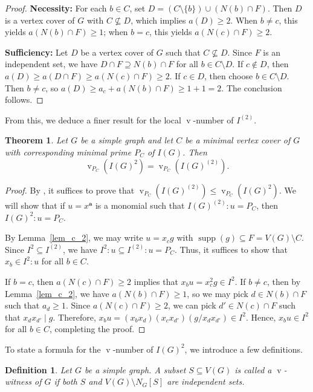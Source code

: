 \documentclass[12pt]{amsart}
\def\v{\operatorname{v}}
\newtheorem{theorem}[lemma]{Theorem}
\newtheorem{definition}[lemma]{Definition}
\begin{document}
\begin{proof}
\textbf{Necessity:} For each $b \in C$, set $D = (C \setminus \{b\}) \cup (N(b) \cap F)$. Then $D$ is a vertex cover of $G$ with $C \not\subseteq D$, which implies $a(D) \ge 2$. When $b \neq c$, this yields $a(N(b) \cap F) \ge 1$; when $b = c$, this yields $a(N(c) \cap F) \ge 2$.

\textbf{Sufficiency:} Let $D$ be a vertex cover of $G$ such that $C \not\subseteq D$. Since $F$ is an independent set, we have $D \cap F \supseteq N(b) \cap F$ for all $b \in C \setminus D$. If $c \notin D$, then $a(D) \ge a(D \cap F) \ge a(N(c) \cap F) \ge 2$. If $c \in D$, then choose $b \in C \setminus D$. Then $b \neq c$, so $a(D) \ge a_c + a(N(b) \cap F) \ge 1 + 1 = 2$. The conclusion follows.
\end{proof}

From this, we deduce a finer result for the local $\v$-number of $I^{(2)}$.

\begin{theorem} 
Let $G$ be a simple graph and let $C$ be a minimal vertex cover of $G$ with corresponding minimal prime $P_C$ of $I(G)$. Then 
$$\v_{P_C}(I(G)^2) = \v_{P_C}(I(G)^{(2)}).$$    
\end{theorem}

\begin{proof}
By \cite[Lemma 2.4]{chjv26}, it suffices to prove that $\v_{P_C}(I(G)^{(2)}) \le \v_{P_C}(I(G)^2)$. We will show that if $u = x^{\mathbf{a}}$ is a monomial such that $I(G)^{(2)} : u = P_C$, then $I(G)^2 : u = P_C$. 

By Lemma~\ref{lem_c_2}, we may write $u = x_c g$ with $\operatorname{supp}(g) \subseteq F = V(G) \setminus C$. Since $I^2 \subseteq I^{(2)}$, we have $I^2 : u \subseteq I^{(2)} : u = P_C$. Thus, it suffices to show that $x_b \in I^2 : u$ for all $b \in C$. 

If $b = c$, then $a(N(c) \cap F) \ge 2$ implies that $x_b u = x_c^2 g \in I^2$. If $b \neq c$, then by Lemma~\ref{lem_c_2}, we have $a(N(b) \cap F) \ge 1$, so we may pick $d \in N(b) \cap F$ such that $a_d \ge 1$. Since $a(N(c) \cap F) \ge 2$, we can pick $d' \in N(c) \cap F$ such that $x_d x_{d'} \mid g$. Therefore, $x_b u = (x_b x_d)(x_c x_{d'}) (g / x_d x_{d'}) \in I^2$. Hence, $x_b u \in I^2$ for all $b \in C$, completing the proof.
\end{proof}

To state a formula for the $\v$-number of $I(G)^2$, we introduce a few definitions.

\begin{definition} 
Let $G$ be a simple graph. A subset $S \subseteq V(G)$ is called a $\v$-witness of $G$ if both $S$ and $V(G) \setminus N_G[S]$ are independent sets.    
\end{definition}
\end{document}
